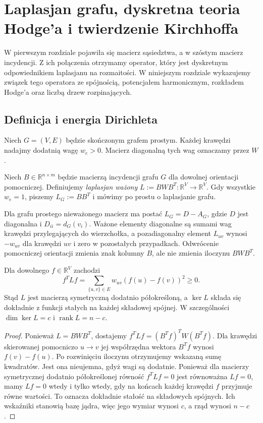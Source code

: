 \chapter{Laplasjan grafu, dyskretna teoria Hodge'a i twierdzenie Kirchhoffa}
\label{ch:tg-laplacian}

W pierwszym rozdziale pojawiła się macierz sąsiedztwa, a w szóstym
macierz incydencji. Z ich połączenia otrzymamy operator, który
jest dyskretnym odpowiednikiem laplasjanu na rozmaitości.
W niniejszym rozdziale wykazujemy związek tego operatora
ze spójnością, potencjałem harmonicznym, rozkładem Hodge'a
oraz liczbą drzew rozpinających.

\section{Definicja i energia Dirichleta}
\label{sec:tg-lap-definition}

Niech $G=(V,E)$ będzie skończonym grafem prostym.
Każdej krawędzi nadajmy dodatnią wagę $w_e>0$.
Macierz diagonalną tych wag oznaczamy przez $W$.

\begin{definicja}
Niech $B\in\mathbb R^{n\times m}$ będzie macierzą incydencji
grafu $G$ dla dowolnej orientacji pomocniczej. Definiujemy
\emph{laplasjan ważony} $L:=BWB^T:\mathbb R^V\to\mathbb R^V$.
Gdy wszystkie $w_e=1$, piszemy $L_G:=BB^T$ i mówimy
po prostu o laplasjanie grafu.
\end{definicja}

Dla grafu prostego nieważonego macierz ma postać
$L_G=D-A_G$, gdzie $D$ jest diagonalna i $D_{ii}=d_G(v_i)$.
Ważone elementy diagonalne są sumami wag krawędzi
przylegających do wierzchołka, a pozadiagonalny element
$L_{uv}$ wynosi $-w_{uv}$ dla krawędzi $uv$ i zero w pozostałych
przypadkach. Odwrócenie pomocniczej orientacji zmienia znak
kolumny $B$, ale nie zmienia iloczynu $BWB^T$.

\begin{twierdzenie}
\label{thm:tg-energy}
Dla dowolnego $f\in\mathbb R^V$ zachodzi
\[
f^TLf=\sum_{\{u,v\}\in E}w_{uv}(f(u)-f(v))^2\ge0.
\]
Stąd $L$ jest macierzą symetryczną dodatnio półokreśloną, a
$\ker L$ składa się dokładnie z funkcji stałych na każdej
składowej spójnej. W szczególności $\dim\ker L=c$ i
$\operatorname{rank}L=n-c$.
\end{twierdzenie}

\begin{proof}
Ponieważ $L=BWB^T$, dostajemy
$f^TLf=(B^Tf)^TW(B^Tf)$. Dla krawędzi skierowanej
pomocniczo $u\to v$ jej współrzędna wektora $B^Tf$
wynosi $f(v)-f(u)$. Po rozwinięciu iloczynu otrzymujemy
wskazaną sumę kwadratów. Jest ona nieujemna, gdyż wagi są
dodatnie. Ponieważ dla macierzy symetrycznej dodatnio
półokreślonej równość $f^TLf=0$ jest równoważna
$Lf=0$, mamy $Lf=0$ wtedy i tylko wtedy, gdy na
końcach każdej krawędzi $f$ przyjmuje równe wartości.
To oznacza dokładnie stałość na składowych spójnych.
Ich wskaźniki stanowią bazę jądra, więc jego wymiar wynosi
$c$, a rząd wynosi $n-c$.
\end{proof}

